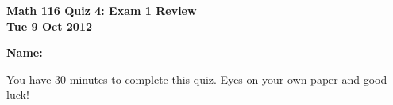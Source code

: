 \documentclass[11pt,letterpaper]{article}
\begin{document}
\flushleft
\begin{multicols}{2}


\begin{large}\textbf{Math 116 Quiz 4: Exam 1 Review \\
Tue 9 Oct 2012}\end{large}

\textbf{Name:  }\underline{\hspace{35ex}}

\vspace{.5in}

\end{multicols}

\pagestyle{empty}


\flushleft

You have 30 minutes to complete this quiz.  Eyes on your own paper and good luck!
\end{document}
